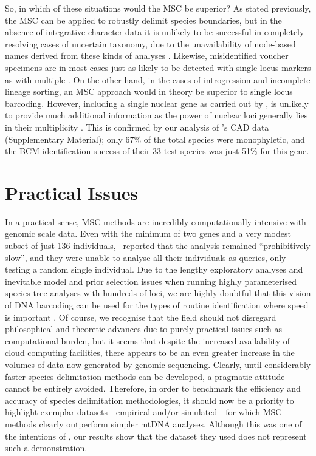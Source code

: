 \documentclass[12pt]{article}
\begin{document}
So, in which of these situations would the MSC be superior? As stated previously, the MSC can be applied to robustly delimit species boundaries, but in the absence of integrative character data it is unlikely to be successful in completely resolving cases of uncertain taxonomy, due to the unavailability of node-based names derived from these kinds of analyses \citep{Bauer2010}. Likewise, misidentified voucher specimens are in most cases just as likely to be detected with single locus markers as with multiple \citep{Becker2011,Ko2013}. On the other hand, in the cases of introgression and incomplete lineage sorting, an MSC approach would in theory be superior to single locus barcoding. However, including a single nuclear gene as carried out by \citeauthor{Dowton2014}, is unlikely to provide much additional information as the power of nuclear loci generally lies in their multiplicity \citep{Edwards2009}. This is confirmed by our analysis of \citeauthor{Dowton2014}'s CAD data (Supplementary Material); only 67\% of the total species were monophyletic, and the BCM identification success of their 33 test species was just 51\% for this gene. 

\section*{Practical Issues}

In a practical sense, MSC methods are incredibly computationally intensive with genomic scale data. Even with the minimum of two genes and a very modest subset of just 136 individuals, \citeauthor{Dowton2014}\ reported that the analysis remained ``prohibitively slow'', and they were unable to analyse all their individuals as queries, only testing a random single individual. Due to the lengthy exploratory analyses and inevitable model and prior selection issues when running highly parameterised species-tree analyses with hundreds of loci, we are highly doubtful that this vision of DNA barcoding can be used for the types of routine identification where speed is important \citep{Armstrong2005}. Of course, we recognise that the field should not disregard philosophical and theoretic advances due to purely practical issues such as computational burden, but it seems that despite the increased availability of cloud computing facilities, there appears to be an even greater increase in the volumes of data now generated by genomic sequencing. Clearly, until considerably faster species delimitation methods can be developed, a pragmatic attitude cannot be entirely avoided.  Therefore, in order to benchmark the efficiency and accuracy of species delimitation methodologies, it should now be a priority to highlight exemplar datasets---empirical and/or simulated---for which MSC methods clearly outperform simpler mtDNA analyses. Although this was one of the intentions of \citeauthor{Dowton2014}, our results show that the dataset they used does not represent such a demonstration. 
\end{document}
